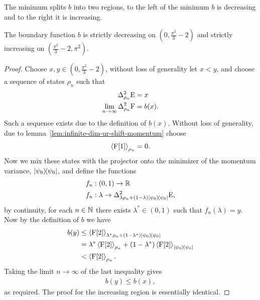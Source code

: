 The minimum splits $b$ into two regions, to the left of the minimum $b$ is decreasing and to the right it is increasing.
\begin{lem}\label{lem:box-ur-fn-dec-inc}
  The boundary function $b$ is strictly decreasing on $\left(0, \frac{\pi^2}{3}-2\right)$ and strictly increasing on $\left(\frac{\pi^2}{3}-2, \pi^2\right)$.
\end{lem}
\begin{proof}
  Choose $x,y \in \left(0,\frac{\pi^2}{3}-2\right)$, without loss of generality let $x < y$, and choose a sequence of states $\rho_n$ such that
  \begin{align}%
    \var[\rho_n]{\ope} &= x\\
    \lim_{n\to\infty}\var[\rho_n]{\opf} &=b(x).
  \end{align}
  Such a sequence exists due to the definition of $b(x)$. Without loss of generality, due to lemma~\ref{lem:infinite-dim-ur-shift-momentum} choose
  \begin{align}
    \left\langle{\operatorname{F}[1]}\right\rangle_{\rho_n} = 0.
  \end{align}
  Now we mix these states with the projector onto the minimizer of the momentum variance, $|\psi_0\rangle\!\langle\psi_0|$, and define the functions
  \begin{align}
    f_n&:(0,1) \to \R\\
    f_n&:\lambda \to \var[\lambda\rho_n+(1-\lambda)\ketbra{\psi_0}{\psi_0}]{\ope},
  \end{align}
  by continuity, for each $n\in\mathbb{N}$ there exists $\lambda^*\in (0,1)$ such that $f_n(\lambda) = y$. Now by the definition of $b$ we have
  \begin{align}
    b(y) &\leq \left\langle{\operatorname{F}[2]}\right\rangle_{\lambda^*\rho_n+(1-\lambda^*)|\psi_0\rangle\!\langle\psi_0|}\\
         &= \lambda^*\left\langle{\operatorname{F}[2]}\right\rangle_{\rho_n}+(1-\lambda^*)\left\langle{\operatorname{F}[2]}\right\rangle_{|\psi_0\rangle\!\langle\psi_0|}\\
         &< \left\langle{\operatorname{F}[2]}\right\rangle_{\rho_n}.
  \end{align}
  Taking the limit $n\to\infty$ of the last inequality gives
  \begin{align}
    b(y) \leq b(x),
  \end{align}
  as required. The proof for the increasing region is essentially identical.
\end{proof}

